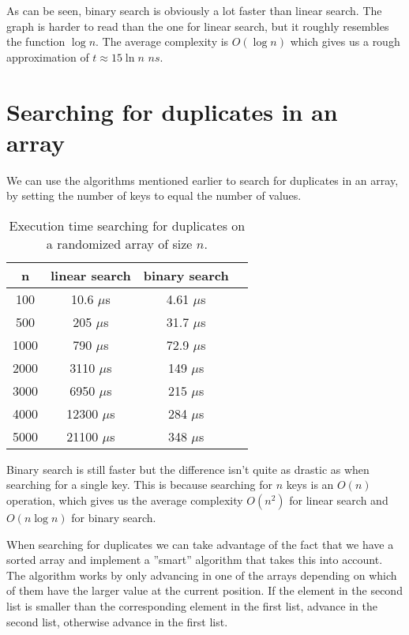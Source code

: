 \documentclass[a4paper,11pt]{article}
\begin{document}
As can be seen, binary search is obviously a lot faster than linear search. The graph is harder to read than the one for linear search, but it roughly resembles the function $\log n$. The average complexity is $O(\log n)$ which gives us a rough approximation of $t \approx 15 \ln n$ $ns$.

\section*{Searching for duplicates in an array}

We can use the algorithms mentioned earlier to search for duplicates in an array, by setting the number of keys to equal the number of values.

\begin{table}[H]
\centering
\begin{tabular}{|c|c|c|c|}
\hline
\textbf{n} & \textbf{linear search} & \textbf{binary search} \\
\hline
	100 & 10.6 $\mu$s & 4.61 $\mu$s \\
	500 & 205 $\mu$s & 31.7 $\mu$s \\
	1000 & 790 $\mu$s & 72.9 $\mu$s \\
	2000 & 3110 $\mu$s & 149 $\mu$s \\
	3000 & 6950 $\mu$s & 215 $\mu$s \\
	4000 & 12300 $\mu$s & 284 $\mu$s \\
	5000 & 21100 $\mu$s & 348 $\mu$s \\
\hline
\end{tabular}
\caption{Execution time searching for duplicates on a randomized array of size $n$.}
\label{tab:table3}
\end{table}

Binary search is still faster but the difference isn't quite as drastic as when searching for a single key. This is because searching for $n$ keys is an $O(n)$ operation, which gives us the average complexity $O(n^2)$ for linear search and $O(n \log n)$ for binary search.

When searching for duplicates we can take advantage of the fact that we have a sorted array and implement a ''smart'' algorithm that takes this into account.
The algorithm works by only advancing in one of the arrays depending on which of them have the larger value at the current position. If the element in the second list is smaller than the corresponding element in the first list, advance in the second list, otherwise advance in the first list.
\end{document}
